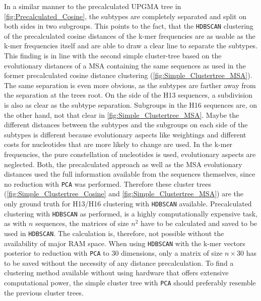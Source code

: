 In a similar manner to the precalculated \gls{UPGMA} tree in \autoref{fig:Precalculated_Cosine}, the subtypes are completely separated and split on both sides in two subgroups. This points to the fact, that the \texttt{HDBSCAN} clustering of the precalculated cosine distances of the k-mer frequencies are as usable as the k-mer frequencies itself and are able to draw a clear line to separate the subtypes. This finding is in line with the second simple cluster-tree based on the evolutionary distances of a \gls{MSA} containing the same sequences as used in the former precalculated cosine distance clustering (\autoref{fig:Simple_Clustertree_MSA}). The same separation is even more obvious, as the subtypes are farther away from the separation at the trees root. On the side of the H13 sequences, a subdivision is also as clear as the subtype separation. Subgroups in the H16 sequences are, on the other hand, not that clear in \autoref{fig:Simple_Clustertree_MSA}. Maybe the different distances between the subtypes and the subgroups on each side of the subtypes is different because evolutionary aspects like weightings and different costs for nucleotides that are more likely to change are used. In the k-mer frequencies, the pure constellation of nucleotides is used, evolutionary aspects are neglected. Both, the precalculated approach as well as the \gls{MSA} evolutionary distances used the full information available from the sequences themselves, since no reduction with \texttt{PCA} was performed. Therefore these cluster trees (\autoref{fig:Simple_Clustertree_Cosine} and \autoref{fig:Simple_Clustertree_MSA}) are the only ground truth for H13/H16 clustering with \texttt{HDBSCAN} available. Precalculated clustering with \texttt{HDBSCAN} as performed, is a highly computationally expensive task, as with $n$ sequences, the matrices of size $n^2$ have to be calculated and saved to be used in \texttt{HDBSCAN}. The calculation is, therefore, not possible without the availability of major RAM space. When using \texttt{HDBSCAN} with the k-mer vectors posterior to reduction with \texttt{PCA} to 30 dimensions, only a matrix of size $n\times 30$ has to be saved without the necessity of any distance precalculation. To find a clustering method available without using hardware that offers extensive computational power, the simple cluster tree with \texttt{PCA} should preferably resemble the previous cluster trees.

\vspace{1em}

